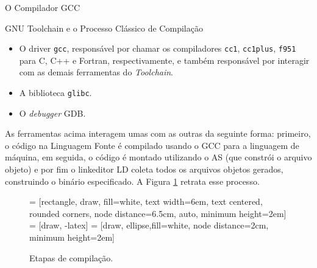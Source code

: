 \begin{section}{O Compilador GCC}
\begin{subsection}{GNU Toolchain e o Processo Clássico de Compilação}
\begin{itemize}
    \item O driver \texttt{gcc}, responsável por chamar os compiladores \texttt{cc1},
        \texttt{cc1plus}, \texttt{f951} para C, C++ e Fortran, respectivamente,
        e também responsável por interagir com as demais ferramentas do 
        \textit{Toolchain}.

    \item A biblioteca \texttt{glibc}.

    \item O \textit{debugger} GDB.
\end{itemize}

As ferramentas acima interagem umas com as outras da seguinte forma: primeiro, o código na
Linguagem Fonte é compilado usando o GCC para a linguagem de máquina, em seguida, o código
é montado utilizando o AS (que constrói o arquivo objeto) e por fim o linkeditor
LD coleta todos os arquivos objetos gerados, construindo o binário especificado. A Figura
\ref{fig:gnu_toolchain} retrata esse processo.


\begin{figure}
 = [rectangle, draw, fill=white,
    text width=6em, text centered, rounded corners, node distance=6.5cm, auto, minimum height=2em]
 = [draw, -latex]
 = [draw, ellipse,fill=white, node distance=2cm,
    minimum height=2em]
\begin{center}
\end{center}
\caption{Etapas de compilação.}
\label{fig:gnu_toolchain}
\end{figure}


\end{subsection}
\end{section}
